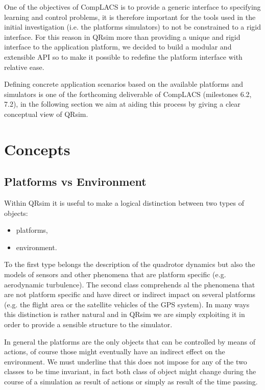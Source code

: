 \documentclass[a4paper,10pt]{report}
\newcommand{\sname}{QRsim\xspace}
\begin{document}
One of the objectives of {CompLACS} is to provide a generic interface to specifying learning and control problems, it is therefore important for the tools used in the initial investigation (i.e. the platforms simulators) to not be constrained to a rigid interface. 
For this reason in \sname more than providing a unique and rigid interface to the application platform, we decided to build a modular and extensible API so to make it possible to redefine the platform interface with relative ease. 

Defining concrete application scenarios based on the available platforms and simulators is one of the forthcoming deliverable of {CompLACS} (milestones 6.2, 7.2), in the following section we aim at aiding this process by giving a clear conceptual view of \sname. 

\section{Concepts}



\subsection{Platforms vs Environment}\label{sec:platandenv}
Within \sname it is useful to make a logical distinction between two types of objects:
\begin{itemize}
\item platforms,
\item environment.
\end{itemize}
To the first type belongs the description of the quadrotor dynamics but also the models of sensors and other phenomena that are platform specific (e.g. aerodynamic turbulence). The second class comprehends al the phenomena that are not platform specific and have direct or indirect impact on several platforms (e.g. the flight area or the satellite vehicles of the GPS system).
In many ways this distinction is rather natural and in \sname we are simply exploiting it in order to provide a sensible structure to the simulator.

In general the platforms are the only objects that can be controlled by means of actions, of course those might eventually have an indirect effect on the environment. We must underline that this does not impose for any of the two classes to be time invariant, in fact both class of object might change during the course of a simulation as result of actions or simply as result of the time passing.
\end{document}
